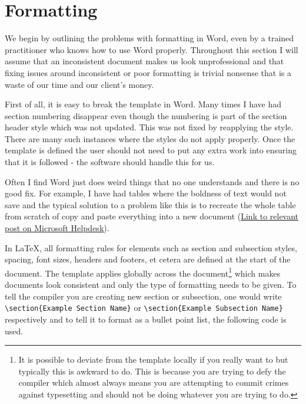 \section{Formatting}
\label{sec:Formatting}

We begin by outlining the problems with formatting in Word, even by a trained practitioner who knows how to use Word properly. Throughout this section I will assume that an inconsistent document makes us look unprofessional and that fixing issues around inconsistent or poor formatting is trivial nonsense that is a waste of our time and our client's money.

First of all, it is easy to break the template in Word. Many times I have had section numbering disappear even though the numbering is part of the section header style which was not updated. This was not fixed by reapplying the style. There are many such instances where the styles do not apply properly. Once the template is defined the user should not need to put any extra work into ensuring that it is followed - the software should handle this for us.

Often I find Word just does weird things that no one understands and there is no good fix. For example, I have had tables where the boldness of text would not save and the typical solution to a problem like this is to recreate the whole table from scratch of copy and paste everything into a new document (\href{https://learn.microsoft.com/en-us/answers/questions/5092571/tables-in-ms-word-are-changing-when-saved-and-re-o}{Link to relevant post on Microsoft Helpdesk}).

In \LaTeX, all formatting rules for elements such as section and subsection styles, spacing, font sizes, headers and footers, et cetera are defined at the start of the document. The template applies globally across the document\footnote{It is possible to deviate from the template locally if you really want to but typically this is awkward to do. This is because you are trying to defy the compiler which almost always means you are attempting to commit crimes against typesetting and should not be doing whatever you are trying to do.} which makes documents look consistent and only the type of formatting needs to be given. To tell the compiler you are creating new section or subsection, one would write \Verb_\section{Example Section Name}_ or \Verb_\section{Example Subsection Name}_ respectively and to tell it to format as a bullet point list, the following code is used.

